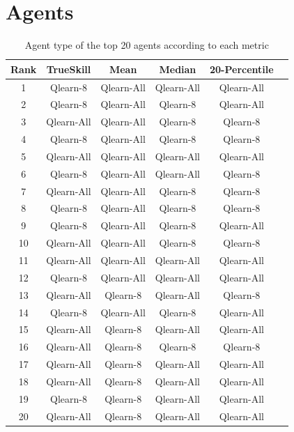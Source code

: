 \section{Agents}
\begin{table}[H]
\centering
\begin{tabular}{|| c | c | c | c | c | c ||} 
 \hline
 Rank & TrueSkill & Mean & Median & 20-Percentile \\ [0.5ex] 
 \hline\hline
   1 &    Qlearn-8 &  Qlearn-All &  Qlearn-All &    Qlearn-All \\
   2 &    Qlearn-8 &  Qlearn-All &    Qlearn-8 &    Qlearn-All \\
   3 &  Qlearn-All &  Qlearn-All &    Qlearn-8 &      Qlearn-8 \\
   4 &    Qlearn-8 &  Qlearn-All &    Qlearn-8 &      Qlearn-8 \\
   5 &  Qlearn-All &  Qlearn-All &  Qlearn-All &    Qlearn-All \\
   6 &    Qlearn-8 &  Qlearn-All &  Qlearn-All &      Qlearn-8 \\
   7 &  Qlearn-All &  Qlearn-All &    Qlearn-8 &      Qlearn-8 \\
   8 &    Qlearn-8 &  Qlearn-All &    Qlearn-8 &      Qlearn-8 \\
   9 &    Qlearn-8 &  Qlearn-All &    Qlearn-8 &    Qlearn-All \\
  10 &  Qlearn-All &  Qlearn-All &    Qlearn-8 &      Qlearn-8 \\
  11 &  Qlearn-All &  Qlearn-All &  Qlearn-All &    Qlearn-All \\
  12 &    Qlearn-8 &  Qlearn-All &  Qlearn-All &    Qlearn-All \\
  13 &  Qlearn-All &    Qlearn-8 &  Qlearn-All &      Qlearn-8 \\
  14 &    Qlearn-8 &  Qlearn-All &    Qlearn-8 &    Qlearn-All \\
  15 &  Qlearn-All &    Qlearn-8 &  Qlearn-All &    Qlearn-All \\
  16 &  Qlearn-All &    Qlearn-8 &    Qlearn-8 &      Qlearn-8 \\
  17 &  Qlearn-All &    Qlearn-8 &  Qlearn-All &    Qlearn-All \\
  18 &  Qlearn-All &    Qlearn-8 &  Qlearn-All &    Qlearn-All \\
  19 &    Qlearn-8 &    Qlearn-8 &  Qlearn-All &    Qlearn-All \\
  20 &  Qlearn-All &    Qlearn-8 &  Qlearn-All &    Qlearn-All \\[1ex] 
 \hline
\end{tabular}
\label{TypeRankings}
\caption{Agent type of the top 20 agents according to each metric}
\end{table}

